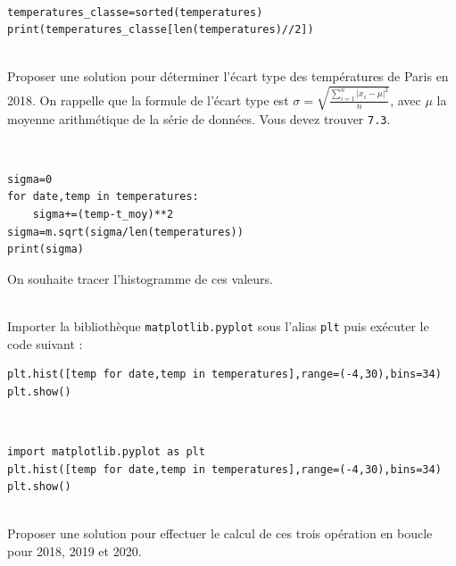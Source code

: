 \begin{solution}~\ \\
\begin{verbatim}
temperatures_classe=sorted(temperatures)
print(temperatures_classe[len(temperatures)//2])
\end{verbatim}
\end{solution}

\begin{exercice}~\\
Proposer une solution pour déterminer l'écart type des températures de Paris en 2018. On rappelle que la formule de l'écart type est $\sigma=\sqrt{\frac{\sum\limits_{i=1}^{n} |x_i-\mu|^2}{n}}$, avec $\mu$ la moyenne arithmétique de la série de données. Vous devez trouver \verb?7.3?.
\end{exercice}

\begin{solution}~\ \\
\begin{verbatim}
sigma=0
for date,temp in temperatures:
    sigma+=(temp-t_moy)**2
sigma=m.sqrt(sigma/len(temperatures))
print(sigma)
\end{verbatim}
\end{solution}

On souhaite tracer l'histogramme de ces valeurs.

\begin{exercice}~\\
Importer la bibliothèque \verb?matplotlib.pyplot? sous l'alias \verb?plt? puis exécuter le code suivant :
\begin{verbatim}
plt.hist([temp for date,temp in temperatures],range=(-4,30),bins=34)
plt.show()
\end{verbatim}
\end{exercice}

\begin{solution}~\ \\
\begin{verbatim}
import matplotlib.pyplot as plt
plt.hist([temp for date,temp in temperatures],range=(-4,30),bins=34)
plt.show()
\end{verbatim}
\end{solution}


\begin{exercice}~\\
Proposer une solution pour effectuer le calcul de ces trois opération en boucle pour 2018, 2019 et 2020.
\end{exercice}

